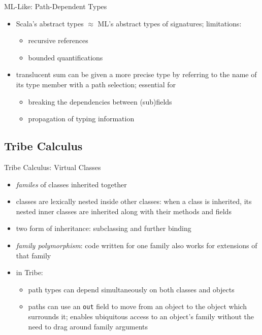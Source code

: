 \documentclass{beamer}
\begin{document}

\begin{frame}{ML-Like: Path-Dependent Types}
\begin{itemize}
\item Scala's abstract types  $\approx$ ML's abstract types of signatures; limitations:
\begin{itemize}
\item recursive references
\item bounded quantifications
\end{itemize}
\item translucent sum can be given a more precise type by referring to the name of its type member with a path selection; essential for
\begin{itemize}
\item breaking the dependencies between (sub)fields
\item propagation of typing information
\end{itemize}
\end{itemize}
\end{frame}

\subsection{Tribe Calculus}

\begin{frame}{Tribe Calculus: Virtual Classes}
\begin{itemize}
\item {\it familes} of classes inherited together
\item classes are lexically nested inside other classes: when a class
  is inherited, its nested inner classes are inherited along with
  their methods and fields
\item two form of inheritance: subclassing and further binding
\item {\it family polymorphism}: code written for one family
  also works for extensions of that family
\item in Tribe:\begin{itemize}
\item path types can depend simultaneously on both classes and objects
\item paths can use an {\tt out} field to move from an object to the
  object which surrounds it; enables ubiquitous access to an object's
  family without the need to drag around family arguments
\end{itemize}
\end{itemize}
\end{frame}
\end{document}
